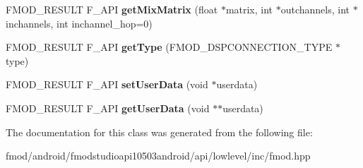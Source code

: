 \begin{DoxyCompactItemize}
\item 
\hypertarget{class_f_m_o_d_1_1_d_s_p_connection_ab374698ec55adfc99a92b915f3d588f0}{F\+M\+O\+D\+\_\+\+R\+E\+S\+U\+L\+T F\+\_\+\+A\+P\+I {\bfseries get\+Mix\+Matrix} (float $\ast$matrix, int $\ast$outchannels, int $\ast$inchannels, int inchannel\+\_\+hop=0)}\label{class_f_m_o_d_1_1_d_s_p_connection_ab374698ec55adfc99a92b915f3d588f0}

\item 
\hypertarget{class_f_m_o_d_1_1_d_s_p_connection_ad99191423ae49d15b2b3ee7c192b53b4}{F\+M\+O\+D\+\_\+\+R\+E\+S\+U\+L\+T F\+\_\+\+A\+P\+I {\bfseries get\+Type} (F\+M\+O\+D\+\_\+\+D\+S\+P\+C\+O\+N\+N\+E\+C\+T\+I\+O\+N\+\_\+\+T\+Y\+P\+E $\ast$type)}\label{class_f_m_o_d_1_1_d_s_p_connection_ad99191423ae49d15b2b3ee7c192b53b4}

\item 
\hypertarget{class_f_m_o_d_1_1_d_s_p_connection_ab3d3a0dc61be71656ee5b1b5d7dab50d}{F\+M\+O\+D\+\_\+\+R\+E\+S\+U\+L\+T F\+\_\+\+A\+P\+I {\bfseries set\+User\+Data} (void $\ast$userdata)}\label{class_f_m_o_d_1_1_d_s_p_connection_ab3d3a0dc61be71656ee5b1b5d7dab50d}

\item 
\hypertarget{class_f_m_o_d_1_1_d_s_p_connection_ad9db81fe98ee0eecb099a565d5ae2a4d}{F\+M\+O\+D\+\_\+\+R\+E\+S\+U\+L\+T F\+\_\+\+A\+P\+I {\bfseries get\+User\+Data} (void $\ast$$\ast$userdata)}\label{class_f_m_o_d_1_1_d_s_p_connection_ad9db81fe98ee0eecb099a565d5ae2a4d}

\end{DoxyCompactItemize}


The documentation for this class was generated from the following file\+:\begin{DoxyCompactItemize}
\item 
fmod/android/fmodstudioapi10503android/api/lowlevel/inc/fmod.\+hpp\end{DoxyCompactItemize}
